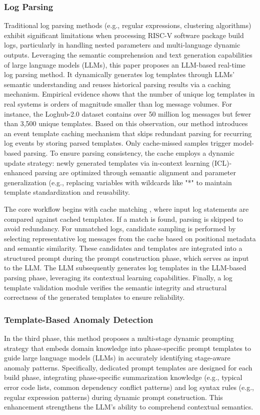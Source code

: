 \documentclass[10pt,conference]{IEEEtran}
\begin{document}
\subsubsection{Log Parsing}\label{ss:lad-parsing}
Traditional log parsing methods (e.g., regular expressions, clustering algorithms) exhibit significant limitations when processing RISC-V software package build logs, particularly in handling nested parameters and multi-language dynamic outputs. Leveraging the semantic comprehension and text generation capabilities of large language models (LLMs), this paper proposes an LLM-based real-time log parsing method. It dynamically generates log templates through LLMs’ semantic understanding and reuses historical parsing results via a caching mechanism. Empirical evidence shows that the number of unique log templates in real systems is orders of magnitude smaller than log message volumes. For instance, the Loghub-2.0 dataset contains over 50 million log messages but fewer than 3,500 unique templates. Based on this observation, our method introduces an event template caching mechanism that skips redundant parsing for recurring log events by storing parsed templates. Only cache-missed samples trigger model-based parsing. To ensure parsing consistency, the cache employs a dynamic update strategy: newly generated templates via in-context learning (ICL)-enhanced parsing are optimized through semantic alignment and parameter generalization (e.g., replacing variables with wildcards like "*" to maintain template standardization and reusability.

The core workflow begins with cache matching , where input log statements are compared against cached templates. If a match is found, parsing is skipped to avoid redundancy. For unmatched logs, candidate sampling is performed by selecting representative log messages from the cache based on positional metadata and semantic similarity. These candidates and templates are integrated into a structured prompt during the prompt construction phase, which serves as input to the LLM. The LLM subsequently generates log templates in the LLM-based parsing phase, leveraging its contextual learning capabilities. Finally, a log template validation module verifies the semantic integrity and structural correctness of the generated templates to ensure reliability.


\subsubsection{Template-Based Anomaly Detection}\label{ss:lad-template}
In the third phase, this method proposes a multi-stage dynamic prompting strategy that embeds domain knowledge into phase-specific prompt templates to guide large language models (LLMs) in accurately identifying stage-aware anomaly patterns. Specifically, dedicated prompt templates are designed for each build phase, integrating phase-specific summarization knowledge (e.g., typical error code lists, common dependency conflict patterns) and log syntax rules (e.g., regular expression patterns) during dynamic prompt construction. This enhancement strengthens the LLM’s ability to comprehend contextual semantics.
\end{document}
